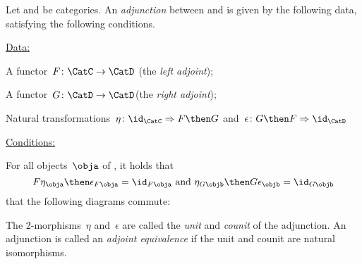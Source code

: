 \begin{ctdefinition}[Adjunction]
  \label{def:cat-adjunction}
  Let \CatC and \CatD be categories. An \emph{adjunction} between \CatC and \CatD is given by the following data, satisfying the following conditions.

  \underline{Data:}
  \begin{compactenum}
    \item A functor~$F\colon \CatC \to \CatD$ (the \emph{left adjoint});
    \item A functor~$G\colon \CatD \to \CatD$(the \emph{right adjoint});
    \item Natural transformations~$\eta \colon \id_\CatC \Rightarrow F \then G$ and~$\epsilon \colon G \then F \Rightarrow \id_\CatD$
  \end{compactenum}

  \underline{Conditions:}
  \begin{compactenum}
    \item For all objects~$\obja$ of \CatC, it holds that
    \begin{equation*}
      F\eta_\obja \then \epsilon_{F\obja} = \id_{F\obja} \text{ and }  \eta_{G\objb} \then G\epsilon_\objb = \id_{G\objb}
    \end{equation*}
     that the following diagrams commute:

\begin{center}
\end{center}
  \end{compactenum}
  The 2-morphisms~$\eta$ and~$\epsilon$ are called the \emph{unit} and \emph{counit} of the adjunction.
  An adjunction is called an \emph{adjoint equivalence} if the unit and counit are natural isomorphisms.
\end{ctdefinition}






